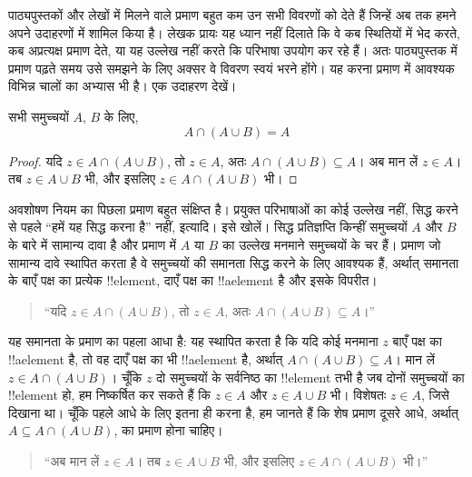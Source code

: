\documentclass[../../../include/open-logic-section]{subfiles}
\begin{document}

पाठ्यपुस्तकों और लेखों में मिलने वाले प्रमाण बहुत कम उन सभी विवरणों को देते
हैं जिन्हें अब तक हमने अपने उदाहरणों में शामिल किया है। लेखक प्रायः यह
ध्यान नहीं दिलाते कि वे कब स्थितियों में भेद करते, कब अप्रत्यक्ष प्रमाण देते,
या यह उल्लेख नहीं करते कि परिभाषा उपयोग कर रहे हैं। अतः पाठ्यपुस्तक में
प्रमाण पढ़ते समय उसे समझने के लिए अक्सर वे विवरण स्वयं भरने होंगे। यह करना
प्रमाण में आवश्यक विभिन्न चालों का अभ्यास भी है। एक उदाहरण देखें।

\begin{prop}[अवशोषण]
सभी समुच्चयों $A$, $B$ के लिए,
\[
A \cap (A \cup B) = A
\]
\end{prop}

\begin{proof}
यदि $z\in A\cap(A\cup B)$, तो $z\in A$, अतः
$A\cap(A\cup B)\subseteq A$। अब मान लें $z\in A$। तब
$z\in A\cup B$ भी, और इसलिए $z\in A\cap(A\cup B)$ भी।
\end{proof}

अवशोषण नियम का पिछला प्रमाण बहुत संक्षिप्त है। प्रयुक्त परिभाषाओं का कोई
उल्लेख नहीं, सिद्ध करने से पहले ``हमें यह सिद्ध करना है'' नहीं, इत्यादि। इसे
खोलें। सिद्ध प्रतिज्ञप्ति किन्हीं समुच्चयों $A$ और $B$ के बारे में सामान्य
दावा है और प्रमाण में $A$ या $B$ का उल्लेख मनमाने समुच्चयों के चर हैं। प्रमाण
जो सामान्य दावे स्थापित करता है वे समुच्चयों की समानता सिद्ध करने के लिए
आवश्यक हैं, अर्थात् समानता के बाएँ पक्ष का प्रत्येक !!{element}, दाएँ पक्ष
का !!a{element} है और इसके विपरीत।

\begin{quote}
``यदि $z\in A\cap(A\cup B)$, तो $z\in A$, अतः
$A\cap(A\cup B)\subseteq A$।''
\end{quote}

यह समानता के प्रमाण का पहला आधा है: यह स्थापित करता है कि यदि कोई मनमाना
$z$ बाएँ पक्ष का !!a{element} है, तो वह दाएँ पक्ष का भी !!a{element} है,
अर्थात् $A\cap(A\cup B)\subseteq A$। मान लें
$z\in A\cap(A\cup B)$। चूँकि $z$ दो समुच्चयों के सर्वनिष्ठ का
!!{element} तभी है जब दोनों समुच्चयों का !!{element} हो, हम निष्कर्षित कर
सकते हैं कि $z\in A$ और $z\in A\cup B$ भी। विशेषतः $z\in A$, जिसे दिखाना
था। चूँकि पहले आधे के लिए इतना ही करना है, हम जानते हैं कि शेष प्रमाण दूसरे
आधे, अर्थात् $A\subseteq A\cap(A\cup B)$, का प्रमाण होना चाहिए।

\begin{quote}
``अब मान लें $z\in A$। तब $z\in A\cup B$ भी, और इसलिए
$z\in A\cap(A\cup B)$ भी।''
\end{quote}
\end{document}
